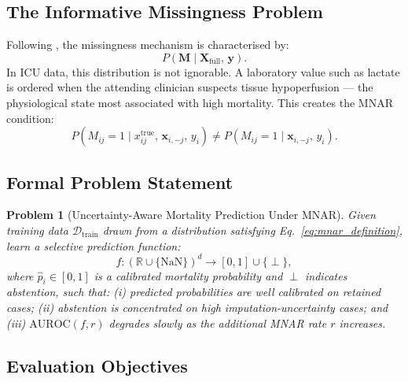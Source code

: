\documentclass[a4paper,fleqn,longmktitle]{cas-sc}
\newtheorem{problem}{Problem}
\begin{document}
	\subsection{The Informative Missingness Problem}
	\label{sec:mnar_problem}
	
	Following \citet{rubin1976inference}, the missingness mechanism is
	characterised by:
	\begin{equation}
		P(\mathbf{M} \mid \mathbf{X}_{\text{full}},\, \mathbf{y}).
		\label{eq:missing_mechanism}
	\end{equation}
	In ICU data, this distribution is not ignorable.
	A laboratory value such as lactate is ordered when the attending
	clinician suspects tissue hypoperfusion — the physiological state
	most associated with high mortality.
	This creates the MNAR condition:
	\begin{equation}
		P(M_{ij} = 1 \mid x^{\text{true}}_{ij},\, \mathbf{x}_{i,-j},\, y_i)
		\ne
		P(M_{ij} = 1 \mid \mathbf{x}_{i,-j},\, y_i).
		\label{eq:mnar_definition}
	\end{equation}
	
	\subsection{Formal Problem Statement}
	\label{sec:formal_problem}
	
	\begin{problem}[Uncertainty-Aware Mortality Prediction Under MNAR]
		\label{prob:main}
		Given training data $\mathcal{D}_{\text{train}}$ drawn from a
		distribution satisfying Eq.~\ref{eq:mnar_definition}, learn a
		selective prediction function:
		\begin{equation}
			f : (\mathbb{R} \cup \{\text{NaN}\})^d \to [0, 1] \cup \{\perp\},
			\label{eq:selective_fn}
		\end{equation}
		where $\hat{p}_i \in [0,1]$ is a calibrated mortality probability and
		$\perp$ indicates abstention, such that:
		(i) predicted probabilities are well calibrated on retained cases;
		(ii) abstention is concentrated on high imputation-uncertainty cases;
		and (iii) $\text{AUROC}(f, r)$ degrades slowly as the additional
		MNAR rate $r$ increases.
	\end{problem}
	
	\subsection{Evaluation Objectives}
	\label{sec:eval_objectives}
	
\end{document}
